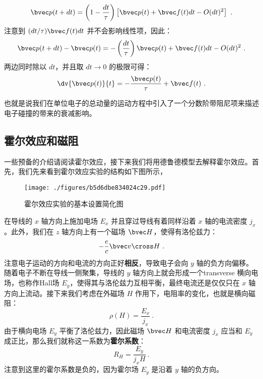 \begin{equation}
\bvec p(t+dt)=\left(1-\frac{dt}{\tau}\right)\left[\bvec p(t)+\bvec f(t)dt - O(dt)^2\right]~.
\end{equation}
注意到 $(dt/\tau)\bvec f(t)dt$ 并不会影响线性项，因此：
\begin{equation}
\bvec p(t+dt)-\bvec p(t)=-\left(\frac{dt}{\tau}\right)\bvec p(t)+\bvec f(t)dt - O(dt)^2~.
\end{equation}
两边同时除以 $dt$，并且取 $dt\rightarrow 0$ 的极限可得：
\begin{equation}\label{eq_DrudeM_3}
\dv{\bvec p(t)}{t}= -\frac{\bvec p(t)}{\tau}+\bvec f(t)~.
\end{equation}

也就是说我们在单位电子的总动量的运动方程中引入了一个分数阶带阻尼项来描述电子碰撞的带来的衰减影响。
\subsection{霍尔效应和磁阻}
一些预备的介绍请阅读霍尔效应，接下来我们将用德鲁德模型去解释霍尔效应。首先，我们先来看到霍尔效应实验的结构如下图所示，
\begin{figure}[ht]
\centering
\texttt{[image: ./figures/b5d6dbe834024c29.pdf]}
\caption{霍尔效应实验的基本设置简化图} \label{fig_DrudeM_2}
\end{figure}
在导线的 $x$ 轴方向上施加电场 $E_x$ 并且穿过导线有着同样沿着 $x$ 轴的电流密度 $j_x$。此外，我们在 $z$ 轴方向上有一个磁场 $\bvec H$，使得有洛伦兹力：
\begin{equation}
-\frac{e}{c}\bvec v \cross H~.
\end{equation}
注意电子运动的方向和电流的方向正好\textbf{相反}，导致电子会向 $y$ 轴的负方向偏移。随着电子不断在导线一侧聚集，导线的 $y$ 轴方向上就会形成一个transverse 横向电场，也称作Hall场 $E_y$，使得其与洛伦兹力互相平衡，最终电流还是仅仅只在 $x$ 轴方向上流动。接下来我们考虑在外磁场 $H$ 作用下，电阻率的变化，也就是横向磁阻：
\begin{equation}
\rho(H)=\frac{E_x}{j_x}~.
\end{equation}
由于横向电场 $E_y$ 平衡了洛伦兹力，因此磁场 $\bvec H$ 和电流密度 $j_x$ 应当和 $E_y$ 成正比，那么我们就称这一系数为\textbf{霍尔系数}：
\begin{equation}\label{eq_DrudeM_5}
R_H = \frac{E_y}{j_xH}~.
\end{equation}
注意到这里的霍尔系数是负的，因为霍尔场 $E_y$ 是沿着 $y$ 轴的负方向。

